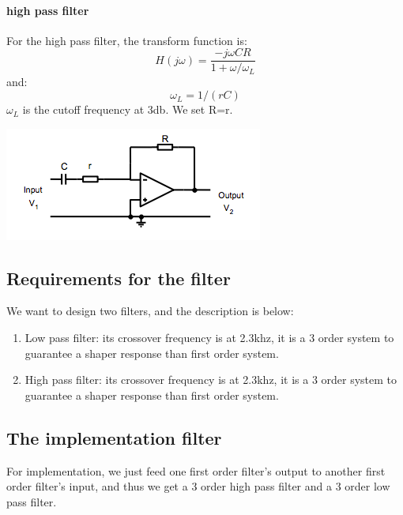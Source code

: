 \documentclass[11pt]{scrartcl}
\begin{document}
\paragraph{high pass filter}
For the high pass filter, the transform function is:
$$H(j\omega) = \frac{-j\omega CR}{1+\omega/\omega_L}$$
and:
$$\omega_L=1/(rC)$$
$\omega_L$ is the cutoff frequency at 3db. We set R=r.

\begin{center}
\begin{minipage}[t]{\linewidth}

{
\includegraphics[scale = 1]{high.png}
}
\end{minipage}
\medskip
\end{center}
\subsection{Requirements for the filter}
We want to design two filters, and the description is below:
\begin{enumerate}
  \item Low pass filter: its crossover frequency is at 2.3khz, it is a 3 order system to guarantee a shaper response than first order system.
  \item High pass filter: its crossover frequency is at 2.3khz, it is a 3 order system to guarantee a shaper response than first order system.
\end{enumerate}

\subsection{The implementation filter}

For implementation, we just feed one first order filter's output to another first order filter's input, and thus we get a 3 order high pass filter and a 3 order low pass filter.
\end{document}
